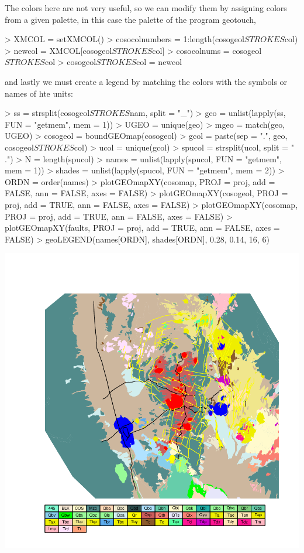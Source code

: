 \documentclass{article}
\begin{document}
The colors here are not very useful, so we can modify them by
assigning colors from a given palette, in this case
the palette of the program geotouch,
\begin{Schunk}
\begin{Sinput}
> XMCOL = setXMCOL()
> cosocolnumbers = 1:length(cosogeol$STROKES$col)
> newcol = XMCOL[cosogeol$STROKES$col]
> cosocolnums = cosogeol$STROKES$col
> cosogeol$STROKES$col = newcol
\end{Sinput}
\end{Schunk}
and lastly we must create a legend by matching the colors with the
symbols or names of hte units:
\begin{Schunk}
\begin{Sinput}
> ss = strsplit(cosogeol$STROKES$nam, split = "_")
> geo = unlist(lapply(ss, FUN = "getmem", mem = 1))
> UGEO = unique(geo)
> mgeo = match(geo, UGEO)
> cosogeol = boundGEOmap(cosogeol)
> gcol = paste(sep = ".", geo, cosogeol$STROKES$col)
> ucol = unique(gcol)
> spucol = strsplit(ucol, split = "\\.")
> N = length(spucol)
> names = unlist(lapply(spucol, FUN = "getmem", mem = 1))
> shades = unlist(lapply(spucol, FUN = "getmem", mem = 2))
> ORDN = order(names)
> plotGEOmapXY(cosomap, PROJ = proj, add = FALSE, ann = FALSE, 
     axes = FALSE)
> plotGEOmapXY(cosogeol, PROJ = proj, add = TRUE, ann = FALSE, 
     axes = FALSE)
> plotGEOmapXY(cosomap, PROJ = proj, add = TRUE, ann = FALSE, axes = FALSE)
> plotGEOmapXY(faults, PROJ = proj, add = TRUE, ann = FALSE, axes = FALSE)
> geoLEGEND(names[ORDN], shades[ORDN], 0.28, 0.14, 16, 6)
\end{Sinput}
\end{Schunk}
\includegraphics{gmap-007}
\end{document}
